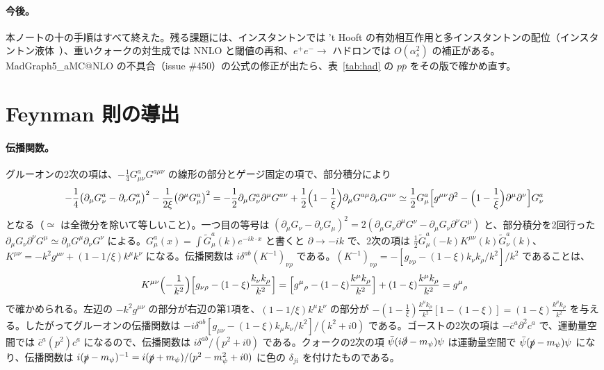 \documentclass[a4paper,10pt]{ltjsarticle}
\begin{document}
\paragraph{今後。}本ノートの十の手順はすべて終えた。残る課題には、インスタントンでは 't Hooft の有効相互作用と多インスタントンの配位（インスタントン液体~\cite{ss98}）、重いクォークの対生成では NNLO と閾値の再和、$e^+e^-\to$ ハドロンでは $O(\alpha_s^2)$ の補正がある。MadGraph5\_aMC@NLO の不具合（issue \#450）の公式の修正が出たら、表~\ref{tab:had} の $p\bar p$ をその版で確かめ直す。

\appendix

\section{Feynman 則の導出}\label{app:rules}

\paragraph{伝播関数。}グルーオンの2次の項は、$-\frac14G^a_{\mu\nu}G^{a\mu\nu}$ の線形の部分とゲージ固定の項で、部分積分により
\begin{equation*}
-\frac14\bigl(\partial_\mu G^a_\nu-\partial_\nu G^a_\mu\bigr)^2-\frac{1}{2\xi}\bigl(\partial^\mu G^a_\mu\bigr)^2
=-\frac12\partial_\mu G^a_\nu\partial^\mu G^{a\nu}+\frac12\Bigl(1-\frac1\xi\Bigr)\partial_\mu G^{a\mu}\partial_\nu G^{a\nu}
\simeq\frac12G^a_\mu\Bigl[g^{\mu\nu}\partial^2-\Bigl(1-\frac1\xi\Bigr)\partial^\mu\partial^\nu\Bigr]G^a_\nu
\end{equation*}
となる（$\simeq$ は全微分を除いて等しいこと）。一つ目の等号は $(\partial_\mu G_\nu-\partial_\nu G_\mu)^2=2(\partial_\mu G_\nu\partial^\mu G^\nu-\partial_\mu G_\nu\partial^\nu G^\mu)$ と、部分積分を2回行った $\partial_\mu G_\nu\partial^\nu G^\mu\simeq\partial_\mu G^\mu\partial_\nu G^\nu$ による。$G^a_\mu(x)=\int\tilde G^a_\mu(k)e^{-ik\cdot x}$ と書くと $\partial\to-ik$ で、2次の項は $\frac12\tilde G^a_\mu(-k)K^{\mu\nu}(k)\tilde G^a_\nu(k)$、$K^{\mu\nu}=-k^2g^{\mu\nu}+(1-1/\xi)k^\mu k^\nu$ になる。伝播関数は $i\delta^{ab}(K^{-1})_{\nu\rho}$ である。$(K^{-1})_{\nu\rho}=-[g_{\nu\rho}-(1-\xi)k_\nu k_\rho/k^2]/k^2$ であることは、
\begin{equation*}
K^{\mu\nu}\Bigl(-\frac{1}{k^2}\Bigr)\Bigl[g_{\nu\rho}-(1-\xi)\frac{k_\nu k_\rho}{k^2}\Bigr]
=\Bigl[g^\mu{}_\rho-(1-\xi)\frac{k^\mu k_\rho}{k^2}\Bigr]+(1-\xi)\frac{k^\mu k_\rho}{k^2}=g^\mu{}_\rho
\end{equation*}
で確かめられる。左辺の $-k^2g^{\mu\nu}$ の部分が右辺の第1項を、$(1-1/\xi)k^\mu k^\nu$ の部分が $-(1-\frac1\xi)\frac{k^\mu k_\rho}{k^2}[1-(1-\xi)]=(1-\xi)\frac{k^\mu k_\rho}{k^2}$ を与える。したがってグルーオンの伝播関数は $-i\delta^{ab}[g_{\mu\nu}-(1-\xi)k_\mu k_\nu/k^2]/(k^2+i0)$ である。ゴーストの2次の項は $-\bar c^a\partial^2c^a$ で、運動量空間では $\bar c^a(p^2)c^a$ になるので、伝播関数は $i\delta^{ab}/(p^2+i0)$ である。クォークの2次の項 $\bar\psi(i\slashed\partial-m_\psi)\psi$ は運動量空間で $\bar\psi(\slashed p-m_\psi)\psi$ になり、伝播関数は $i(\slashed p-m_\psi)^{-1}=i(\slashed p+m_\psi)/(p^2-m_\psi^2+i0)$ に色の $\delta_{ji}$ を付けたものである。
\end{document}
